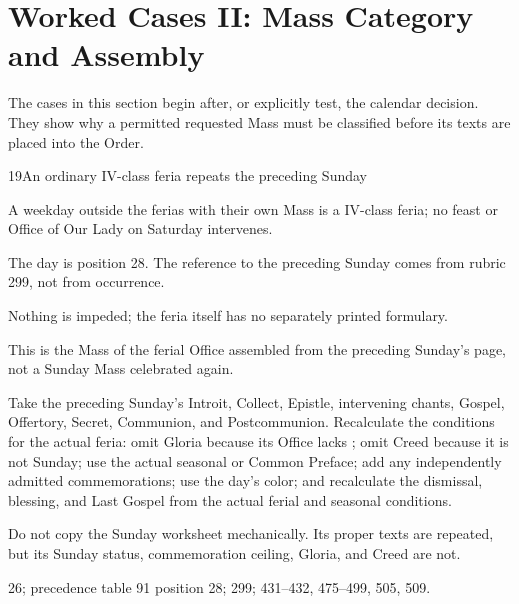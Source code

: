 \section{Worked Cases II: Mass Category and Assembly}
\label{sec:assembly-cases}

The cases in this section begin after, or explicitly test, the calendar decision.  They show why a permitted requested Mass must be classified before its texts are placed into the Order.

\begin{casefile}{19}{An ordinary IV-class feria repeats the preceding Sunday}
\item[Calendar facts] A weekday outside the ferias with their own Mass is a IV-class feria; no feast or Office of Our Lady on Saturday intervenes.
\item[Ranks and rows] The day is position 28.  The reference to the preceding Sunday comes from rubric 299, not from occurrence.
\item[Impeded item] Nothing is impeded; the feria itself has no separately printed formulary.
\item[Mass category] This is the Mass of the ferial Office assembled from the preceding Sunday's page, not a Sunday Mass celebrated again.
\item[Assembly] Take the preceding Sunday's Introit, Collect, Epistle, intervening chants, Gospel, Offertory, Secret, Communion, and Postcommunion.  Recalculate the conditions for the actual feria: omit Gloria because its Office lacks ; omit Creed because it is not Sunday; use the actual seasonal or Common Preface; add any independently admitted commemorations; use the day's color; and recalculate the dismissal, blessing, and Last Gospel from the actual ferial and seasonal conditions.
\item[Boundary] Do not copy the Sunday worksheet mechanically.  Its proper texts are repeated, but its Sunday status, commemoration ceiling, Gloria, and Creed are not.
\item[Rubric locus] 26; precedence table 91 position 28; 299; 431--432, 475--499, 505, 509.
\end{casefile}

